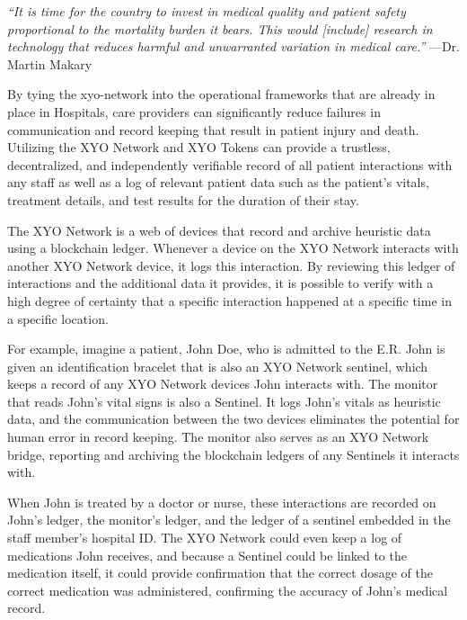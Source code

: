 \documentclass{article}
\begin{document}
\begin{displayquote}\textit{``It is time for the country to invest in medical quality and patient safety proportional to the mortality burden it bears. This would [include] research in technology that reduces harmful and unwarranted variation in medical care.''} \cite{makary-johnshopkins}
\vspace{2mm}
---Dr. Martin Makary
\end{displayquote}

By tying the \Gls{xyo-network} into the operational frameworks that are already in place in Hospitals, care providers can significantly reduce failures in communication and record keeping that result in patient injury and death. Utilizing the XYO Network and XYO Tokens can provide a \gls{trustless}, decentralized, and independently verifiable record of all patient interactions with any staff as well as a log of relevant patient data such as the patient's vitals, treatment details, and test results for the duration of their stay.

The XYO Network is a web of devices that record and archive \gls{heuristic} data using a blockchain ledger. Whenever a device on the XYO Network interacts with another XYO Network device, it logs this interaction. By reviewing this ledger of interactions and the additional data it provides, it is possible to verify with a high degree of \gls{certainty} that a specific interaction happened at a specific time in a specific location.

For example, imagine a patient, John Doe, who is admitted to the E.R. John is given an identification bracelet that is also an XYO Network \Gls{sentinel}, which keeps a record of any XYO Network devices John interacts with. The monitor that reads John's vital signs is also a Sentinel. It logs John's vitals as heuristic data, and the communication between the two devices eliminates the potential for human error in record keeping. The monitor also serves as an XYO Network \Gls{bridge}, reporting and archiving the blockchain ledgers of any Sentinels it interacts with.

When John is treated by a doctor or nurse, these interactions are recorded on John's ledger, the monitor's ledger, and the ledger of a \Gls{sentinel} embedded in the staff member's hospital ID. The XYO Network could even keep a log of medications John receives, and because a Sentinel could be linked to the medication itself, it could provide confirmation that the correct dosage of the correct medication was administered, confirming the \gls{accuracy} of John's medical record.
\end{document}
